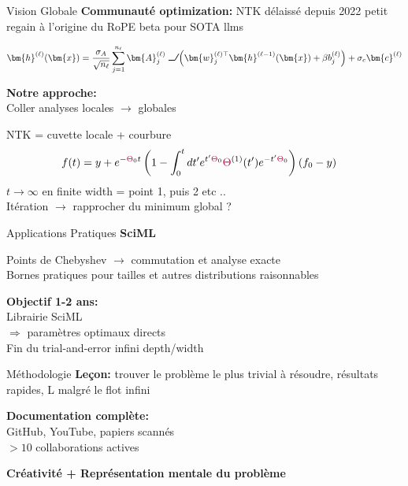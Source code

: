 \documentclass{beamer}
\DeclareRobustCommand{\ReLU}{\mathrel{\text{%
\begin{tikzpicture}[baseline=(current bounding box.south)]
    \draw[thick] (0,0) -- (0.25,0) -- (0.4,0.25);
\end{tikzpicture}}}\!\!}
\begin{document}
\begin{frame}{Vision Globale}
\textbf{Communauté optimization:} NTK délaissé depuis 2022
petit regain à l'origine du RoPE beta pour SOTA llms

\begin{align}
    \bm{h}^{(\ell)}(\bm{x}) = \frac{\sigma_A}{\sqrt{n_\ell}} \sum_{j=1}^{n_\ell} \bm{A}_j^{(\ell)} \ReLU\left(\bm{w}_j^{(\ell)\top} \bm{h}^{(\ell-1)}(\bm{x}) + \beta b_j^{(\ell)}\right) + \sigma_c \bm{c}^{(\ell)} \label{eq:ntk_rope_beta}
\end{align}

\vspace{0.5cm}

\textbf{Notre approche:}\\
Coller analyses locales $\rightarrow$ globales

NTK = cuvette locale + courbure\\
\begin{align}
    f(t) &= y + e^{-\textcolor{purple}{\Theta}_{0}t}\left(1-\int_{0}^{t}dt'e^{t'\textcolor{purple}{\Theta}_{0}}\textcolor{purple}{\Theta}^{(1)}(t')e^{-t'\textcolor{purple}{\Theta}_{0}}\right)\left(f_{0}-y\right) \label{eq:evolution_solution}
    \end{align}
$t \to \infty$ en finite width = point 1, puis 2 etc .. \\
Itération $\rightarrow$ rapprocher du minimum global ?
\end{frame}

\begin{frame}{Applications Pratiques}
\textbf{SciML}

Points de Chebyshev $\rightarrow$ commutation et analyse exacte\\
Bornes pratiques pour tailles et autres distributions raisonnables

\vspace{0.5cm}

\textbf{Objectif 1-2 ans:}\\ 
Librairie SciML\\
$\Rightarrow$ paramètres optimaux directs\\
Fin du trial-and-error infini depth/width
\end{frame}

\begin{frame}{Méthodologie}
\textbf{Leçon:} trouver le problème le plus trivial à résoudre, résultats rapides, 
L malgré le flot infini

\vspace{0.5cm}

\textbf{Documentation complète:}\\
GitHub, YouTube, papiers scannés\\
$>10$ collaborations actives

\vspace{0.5cm}

\textbf{Créativité + Représentation mentale du problème}\\
\end{frame}
\end{document}
